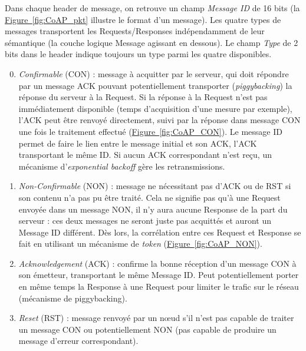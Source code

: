 \documentclass[]{report}
\newcommand{\wordlink}[2]{\hyperref[#2]{#1~\ref{#2}}}
\begin{document}
\par Dans chaque header de message, on retrouve un champ \textit{Message ID} de 16 bits (la \wordlink{Figure}{fig:CoAP_pkt} illustre le format d'un message). Les quatre types de messages transportent les Requests/Responses indépendamment de leur sémantique (la couche logique Message agissant en dessous). Le champ \textit{Type} de 2 bits dans le header indique toujours un type parmi les quatre disponibles.

\newpage

\begin{enumerate}[leftmargin=*]
\setcounter{enumi}{-1}
\item \textit{Confirmable} (CON) : message à acquitter par le serveur, qui doit répondre par un message ACK pouvant potentiellement transporter (\textit{piggybacking}) la réponse du serveur à la Request. Si la réponse à la Request n'est pas immédiatement disponible (temps d'acquisition d'une mesure par exemple), l'ACK peut être renvoyé directement, suivi par la réponse dans message CON une fois le traitement effectué (\wordlink{Figure}{fig:CoAP_CON}). Le message ID permet de faire le lien entre le message initial et son ACK, l'ACK transportant le même ID. Si aucun ACK correspondant n'est reçu, un mécanisme d'\textit{exponential backoff} gère les retransmissions.
\vspace{0.1cm}

\item  \textit{Non-Confirmable} (NON) : message ne nécessitant pas d'ACK ou de RST si son contenu n'a pas pu être traité. Cela ne signifie pas qu'à une Request envoyée dans un message NON, il n'y aura aucune Response de la part du serveur : ces deux messages ne seront juste pas acquittés et auront un Message ID différent. Dès lors, la corrélation entre ces Request et Response se fait en utilisant un mécanisme de \textit{token} (\wordlink{Figure}{fig:CoAP_NON}).
\vspace{0.1cm}

\item \textit{Acknowledgement} (ACK) : confirme la bonne réception d'un message CON à son émetteur, transportant le même Message ID. Peut potentiellement porter en même temps la Response à une Request pour limiter le trafic sur le réseau (mécanisme de piggybacking).
\vspace{0.1cm}

\item \textit{Reset} (RST) : message renvoyé par un nœud s'il n'est pas capable de traiter un message CON ou potentiellement NON (pas capable de produire un message d'erreur correspondant).
\end{enumerate}
\end{document}
